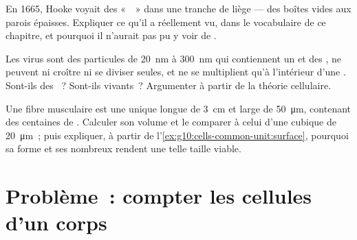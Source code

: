 \begin{exercise}[$\star\star\star$]\label{exo:g10:cells-common-unit:13}
En 1665, Hooke voyait des «~~» dans une tranche de liège ---
des boîtes vides aux parois épaisses. Expliquer ce qu'il a réellement
vu, dans le vocabulaire de ce chapitre, et pourquoi il n'aurait pas pu
y voir de .
\end{exercise}

\begin{exercise}[$\star\star\star$]\label{exo:g10:cells-common-unit:14}
Les virus sont des particules de \qty{20}{nm} à \qty{300}{nm} qui
contiennent un  et des , ne peuvent ni croître
ni se diviser seules, et ne se multiplient qu'à l'intérieur d'une
. Sont-ils des ~? Sont-ils vivants~? Argumenter à
partir de la théorie cellulaire.
\end{exercise}

\begin{exercise}[$\star\star\star$]\label{exo:g10:cells-common-unit:15}
Une fibre musculaire est une  unique longue de \qty{3}{cm} et
large de \qty{50}{\micro m}, contenant des centaines de .
Calculer son volume et le comparer à celui d'une  cubique de
\qty{20}{\micro m}~; puis expliquer, à partir de
l'\cref{ex:g10:cells-common-unit:surface}, pourquoi sa forme et ses
nombreux  rendent une telle taille viable.
\end{exercise}

\section{Problème~: compter les cellules d'un corps}

